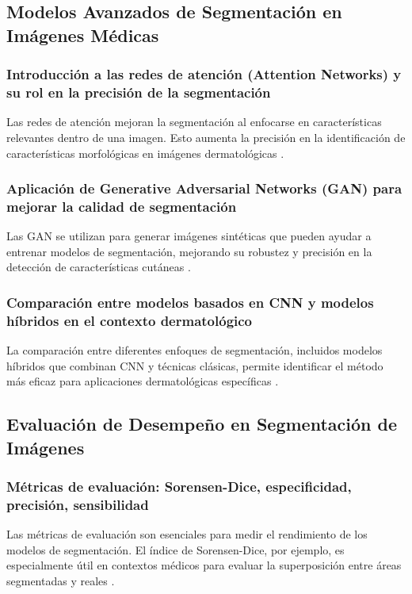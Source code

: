 \subsection{Modelos Avanzados de Segmentación en Imágenes Médicas}

\subsubsection{Introducción a las redes de atención (Attention Networks) y su rol en la precisión de la segmentación}
Las redes de atención mejoran la segmentación al enfocarse en características relevantes dentro de una imagen. Esto aumenta la precisión en la identificación de características morfológicas en imágenes dermatológicas \cite{wang2018}.

\subsubsection{Aplicación de Generative Adversarial Networks (GAN) para mejorar la calidad de segmentación}
Las GAN se utilizan para generar imágenes sintéticas que pueden ayudar a entrenar modelos de segmentación, mejorando su robustez y precisión en la detección de características cutáneas \cite{goodfellow2014}.

\subsubsection{Comparación entre modelos basados en CNN y modelos híbridos en el contexto dermatológico}
La comparación entre diferentes enfoques de segmentación, incluidos modelos híbridos que combinan CNN y técnicas clásicas, permite identificar el método más eficaz para aplicaciones dermatológicas específicas \cite{hussain2021}.

\subsection{Evaluación de Desempeño en Segmentación de Imágenes}

\subsubsection{Métricas de evaluación: Sorensen-Dice, especificidad, precisión, sensibilidad}
Las métricas de evaluación son esenciales para medir el rendimiento de los modelos de segmentación. El índice de Sorensen-Dice, por ejemplo, es especialmente útil en contextos médicos para evaluar la superposición entre áreas segmentadas y reales \cite{sorensen1948}.

